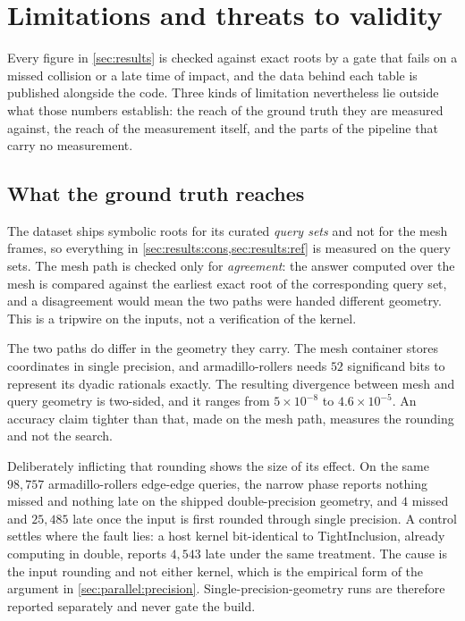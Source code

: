 \section{Limitations and threats to validity}
\label{sec:limitations}

Every figure in \cref{sec:results} is checked against exact roots by a gate that
fails on a missed collision or a late time of impact, and the data behind each
table is published alongside the code. Three kinds of limitation nevertheless
lie outside what those numbers establish: the reach of the ground truth they are
measured against, the reach of the measurement itself, and the parts of the
pipeline that carry no measurement.

\subsection{What the ground truth reaches}

The dataset ships symbolic roots for its curated \emph{query sets} and not for
the mesh frames, so everything in \cref{sec:results:cons,sec:results:ref} is
measured on the query sets. The mesh path is checked only for
\emph{agreement}: the answer computed over the mesh is compared against the
earliest exact root of the corresponding query set, and a disagreement would
mean the two paths were handed different geometry. This is a tripwire on the
inputs, not a verification of the kernel.

The two paths do differ in the geometry they carry. The mesh container stores
coordinates in single precision, and armadillo-rollers needs $52$ significand
bits to represent its dyadic rationals exactly. The resulting divergence between
mesh and query geometry is two-sided, and it ranges from $5\times10^{-8}$ to
$4.6\times10^{-5}$. An accuracy claim tighter than that, made on the mesh path,
measures the rounding and not the search.

Deliberately inflicting that rounding shows the size of its effect. On the same
$98{,}757$ armadillo-rollers edge-edge queries, the narrow phase reports
nothing missed and nothing late on the shipped double-precision geometry, and $4$ missed
and $25{,}485$ late once the input is first rounded through single precision. A
control settles where the fault lies: a host kernel bit-identical to
TightInclusion, already computing in double, reports $4{,}543$ late under the
same treatment. The cause is the input rounding and not either kernel, which is
the empirical form of the argument in \cref{sec:parallel:precision}.
Single-precision-geometry runs are therefore reported separately and never gate
the build.

